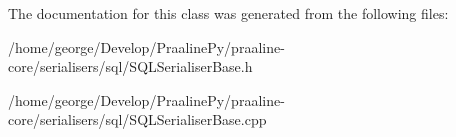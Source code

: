 The documentation for this class was generated from the following files\+:\begin{DoxyCompactItemize}
\item 
/home/george/\+Develop/\+Praaline\+Py/praaline-\/core/serialisers/sql/S\+Q\+L\+Serialiser\+Base.\+h\item 
/home/george/\+Develop/\+Praaline\+Py/praaline-\/core/serialisers/sql/S\+Q\+L\+Serialiser\+Base.\+cpp\end{DoxyCompactItemize}
